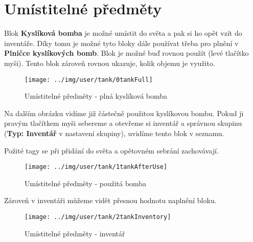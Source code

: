 
\section{Umístitelné předměty}

Blok \textbf{Kyslíková bomba} je možné umístit do světa a pak si ho opět vzít do inventáře. Díky tomu je možné tyto bloky dále používat třeba pro plnění v \textbf{Plničce kyslíkových bomb}.
Blok je možné buď rovnou použít (levé tlačítko myši).
Tento blok zároveň rovnou ukazuje, kolik objemu je využito.

\begin{figure}[!ht]\centering
\texttt{[image: ../img/user/tank/0tankFull]}

\caption{Umístitelné předměty - plná kyslíková bomba}
\label{fig:user_tank_0tankFull}

\end{figure}

\FloatBarrier

Na dalším obrázku vidíme již částečně použitou kyslíkovou bombu. Pokud ji pravým tlačítkem myši sebereme a otevřeme si inventář a správnou skupinu (\textbf{Typ: Inventář} v nastavení skupiny), uvidíme tento blok v seznamu.

Požité tagy se při přidání do světa a opětovném sebrání zachovávají.

\begin{figure}[!ht]\centering
\texttt{[image: ../img/user/tank/1tankAfterUse]}

\caption{Umístitelné předměty - použitá bomba}
\label{fig:user_tank_1tankAfterUse}

\end{figure}

\FloatBarrier

Zároveň v inventáři můžeme vidět přesnou hodnotu naplnění bloku.

\begin{figure}[!ht]\centering
\texttt{[image: ../img/user/tank/2tankInventory]}

\caption{Umístitelné předměty - inventář}
\label{fig:user_tank_2tankInventory}

\end{figure}



\FloatBarrier